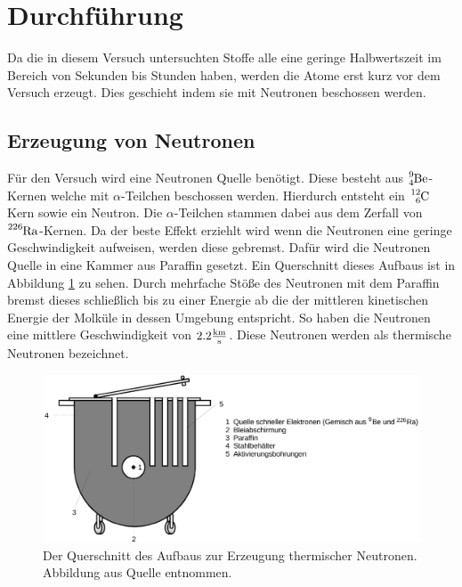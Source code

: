 \section{Durchführung}
\label{sec:Durchführung}

Da die in diesem Versuch untersuchten Stoffe alle eine geringe Halbwertszeit im Bereich von Sekunden bis Stunden haben, werden die Atome erst kurz vor dem Versuch erzeugt.
Dies geschieht indem sie mit Neutronen beschossen werden.

\subsection{Erzeugung von Neutronen}

Für den Versuch wird eine Neutronen Quelle benötigt.
Diese besteht aus $\ce{^{9}_{4}Be}$-Kernen welche mit $\alpha$-Teilchen beschossen werden.
Hierdurch entsteht ein $\ce{^{12}_{6}C}$ Kern sowie ein Neutron.
Die $\alpha$-Teilchen stammen dabei aus dem Zerfall von $\ce{^{226}Ra}$-Kernen.
Da der beste Effekt erziehlt wird wenn die Neutronen eine geringe Geschwindigkeit aufweisen, werden diese gebremst.
Dafür wird die Neutronen Quelle in eine Kammer aus Paraffin gesetzt.
Ein Querschnitt dieses Aufbaus ist in Abbildung \ref{fig:quer} zu sehen.
Durch mehrfache Stöße des Neutronen mit dem Paraffin bremst dieses schließlich bis zu einer Energie ab die der mittleren kinetischen Energie der Molküle in dessen Umgebung entspricht.
So haben die Neutronen eine mittlere Geschwindigkeit von $2.2\si{\frac{\kilo\meter}{\second}}$.
Diese Neutronen werden als thermische Neutronen bezeichnet.
\begin{figure}
    \centering
    \includegraphics[width=\textwidth]{content/data/quer.png}
    \caption{Der Querschnitt des Aufbaus zur Erzeugung thermischer Neutronen. Abbildung aus Quelle \cite{anleitung} entnommen.}
    \label{fig:quer}
\end{figure}
\FloatBarrier

